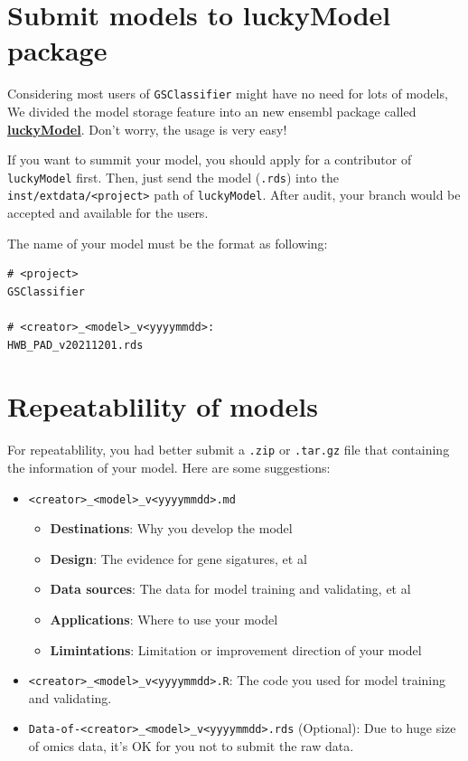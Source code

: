 \documentclass[
  12pt,
]{book}
\begin{document}
\hypertarget{submit-models-to-luckymodel-package}{%
\section{Submit models to luckyModel package}\label{submit-models-to-luckymodel-package}}

Considering most users of \texttt{GSClassifier} might have no need for lots of models, We divided the model storage feature into an new ensembl package called \href{https://github.com/huangwb8/luckyModel}{\textbf{luckyModel}}. Don't worry, the usage is very easy!

If you want to summit your model, you should apply for a contributor of \texttt{luckyModel} first. Then, just send the model (\texttt{.rds}) into the \texttt{inst/extdata/\textless{}project\textgreater{}} path of \texttt{luckyModel}. After audit, your branch would be accepted and available for the users.

The name of your model must be the format as following:

\begin{verbatim}
# <project>
GSClassifier

# <creator>_<model>_v<yyyymmdd>:
HWB_PAD_v20211201.rds
\end{verbatim}

\hypertarget{repeatablility-of-models}{%
\section{Repeatablility of models}\label{repeatablility-of-models}}

For repeatablility, you had better submit a \texttt{.zip} or \texttt{.tar.gz} file that containing the information of your model. Here are some suggestions:

\begin{itemize}
\item
  \texttt{\textless{}creator\textgreater{}\_\textless{}model\textgreater{}\_v\textless{}yyyymmdd\textgreater{}.md}

  \begin{itemize}
  \item
    \textbf{Destinations}: Why you develop the model
  \item
    \textbf{Design}: The evidence for gene sigatures, et al
  \item
    \textbf{Data sources}: The data for model training and validating, et al
  \item
    \textbf{Applications}: Where to use your model
  \item
    \textbf{Limintations}: Limitation or improvement direction of your model
  \end{itemize}
\item
  \texttt{\textless{}creator\textgreater{}\_\textless{}model\textgreater{}\_v\textless{}yyyymmdd\textgreater{}.R}: The code you used for model training and validating.
\item
  \texttt{Data-of-\textless{}creator\textgreater{}\_\textless{}model\textgreater{}\_v\textless{}yyyymmdd\textgreater{}.rds} (Optional): Due to huge size of omics data, it's OK for you not to submit the raw data.
\end{itemize}
\end{document}
